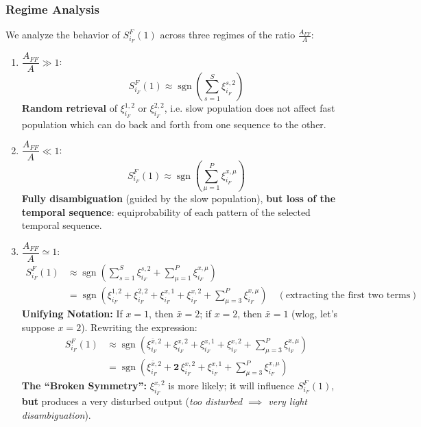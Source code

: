\subsubsection*{Regime Analysis}

We analyze the behavior of $S_{i_F}^F(1)$ across three regimes of the ratio $\frac{A_{FF}}{A}$:

\begin{enumerate}
    \item $\dfrac{A_{FF}}{A} \gg 1$:
    \begin{equation}
    S_{i_F}^F(1) \approx \operatorname{sgn}\left( \sum_{s=1}^{S} \xi_{i_F}^{s,2} \right)
    \end{equation}
    \textbf{Random retrieval} of $\xi_{i_F}^{1,2}$ or $\xi_{i_F}^{2,2}$, i.e. slow population does not affect fast population which can do back and forth from one sequence to the other.

    \item $\dfrac{A_{FF}}{A} \ll 1$:
    \begin{equation}
    S_{i_F}^F(1) \approx \operatorname{sgn}\left( \sum_{\mu=1}^{P} \xi_{i_F}^{x,\mu} \right)
    \end{equation}
    \textbf{Fully disambiguation} (guided by the slow population), \textbf{but loss of the temporal sequence}: equiprobability of each pattern of the selected temporal sequence.

    \item $\dfrac{A_{FF}}{A} \simeq 1$:
    \begin{align}
    S_{i_F}^F(1) &\approx \operatorname{sgn}\left( \sum_{s=1}^{S} \xi_{i_F}^{s,2} + \sum_{\mu=1}^{P} \xi_{i_F}^{x,\mu} \right) \nonumber \\
    &= \operatorname{sgn}\left( \xi_{i_F}^{1,2} + \xi_{i_F}^{2,2} + \xi_{i_F}^{x,1} + \xi_{i_F}^{x,2} + \sum_{\mu=3}^{P} \xi_{i_F}^{x,\mu} \right) \quad (\text{extracting the first two terms})
    \end{align}
    \textbf{Unifying Notation:} If $x=1$, then $\bar{x}=2$; if $x=2$, then $\bar{x}=1$ (wlog, let's suppose $x=2$). Rewriting the expression:
    \begin{align}
    S_{i_F}^F(1) &\approx \operatorname{sgn}\left( \xi_{i_F}^{\bar{x},2} + \xi_{i_F}^{x,2} + \xi_{i_F}^{x,1} + \xi_{i_F}^{x,2} + \sum_{\mu=3}^{P} \xi_{i_F}^{x,\mu} \right) \nonumber \\
    &= \operatorname{sgn}\left( \xi_{i_F}^{\bar{x},2} + \mathbf{2}\,\xi_{i_F}^{x,2} + \xi_{i_F}^{x,1} + \sum_{\mu=3}^{P} \xi_{i_F}^{x,\mu} \right)
    \end{align}
    \textbf{The ``Broken Symmetry'':} $\xi_{i_F}^{x,2}$ is more likely; it will influence $S_{i_F}^F(1)$, \textbf{but} produces a very disturbed output (\textit{too disturbed $\implies$ very light disambiguation}).
\end{enumerate}

